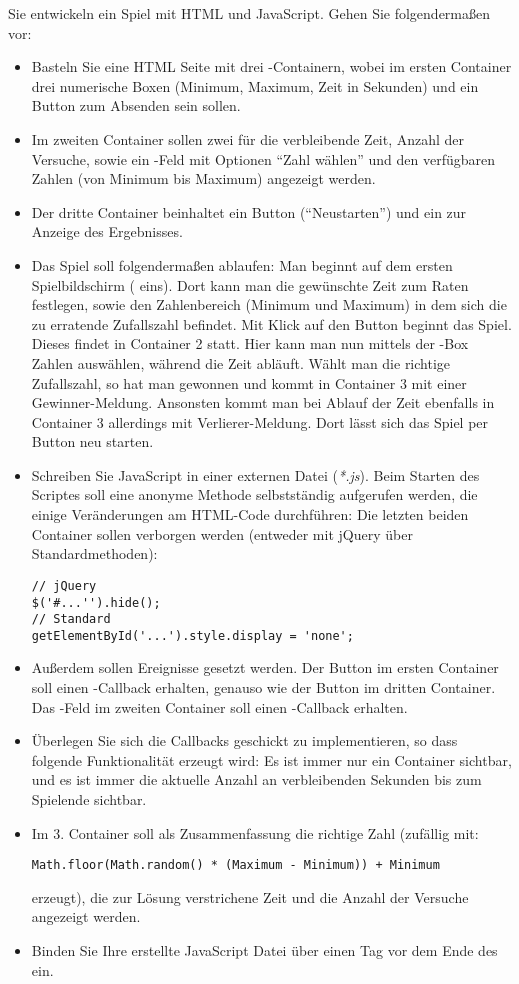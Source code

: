 %
\par Sie entwickeln ein Spiel mit HTML und JavaScript. Gehen Sie folgendermaßen
vor:
%
\begin{itemize}
\item
Basteln Sie eine HTML Seite mit drei -Containern, wobei im ersten
Container drei numerische Boxen (Minimum, Maximum, Zeit in Sekunden) und ein
Button zum Absenden sein sollen.
\item
Im zweiten Container sollen zwei  für die verbleibende Zeit, Anzahl der
Versuche, sowie ein -Feld mit Optionen ``Zahl wählen'' und den
verfügbaren Zahlen (von Minimum bis Maximum) angezeigt werden.
\item
Der dritte Container beinhaltet ein Button (``Neustarten'') und ein 
zur Anzeige des Ergebnisses.
\item
Das Spiel soll folgendermaßen ablaufen: Man beginnt auf dem ersten Spielbildschirm ( eins). Dort kann man die gewünschte Zeit zum Raten festlegen, sowie den Zahlenbereich (Minimum und Maximum) in dem sich die zu erratende Zufallszahl befindet. Mit Klick auf den Button beginnt das Spiel. Dieses findet in Container 2 statt. Hier kann man nun mittels der -Box Zahlen auswählen, während die Zeit abläuft. Wählt man die richtige Zufallszahl, so hat man gewonnen und kommt in Container 3 mit einer Gewinner-Meldung. Ansonsten kommt man bei Ablauf der Zeit ebenfalls in Container 3 allerdings mit Verlierer-Meldung. Dort lässt sich das Spiel per Button neu starten.
\item
Schreiben Sie JavaScript in einer externen Datei (\emph{*.js}). Beim Starten
des Scriptes soll eine anonyme Methode selbstständig aufgerufen werden, die
einige Veränderungen am HTML-Code durchführen: Die letzten beiden Container
sollen verborgen werden (entweder mit jQuery über Standardmethoden):
%
\begin{lstlisting}
// jQuery
$('#...'').hide();
// Standard
getElementById('...').style.display = 'none';
\end{lstlisting}
%
\item
Außerdem sollen Ereignisse gesetzt werden. Der Button im ersten Container soll
einen -Callback erhalten, genauso wie der Button im dritten
Container. Das -Feld im zweiten Container soll einen
-Callback erhalten.
\item
Überlegen Sie sich die Callbacks geschickt zu implementieren, so dass folgende
Funktionalität erzeugt wird: Es ist immer nur ein Container sichtbar, und es
ist immer die aktuelle Anzahl an verbleibenden Sekunden bis zum Spielende
sichtbar.
\item
Im 3. Container soll als Zusammenfassung die richtige Zahl (zufällig mit:
%
\begin{lstlisting}
Math.floor(Math.random() * (Maximum - Minimum)) + Minimum
\end{lstlisting}
%
erzeugt), die zur Lösung verstrichene Zeit und die Anzahl der Versuche
angezeigt werden.
\item
Binden Sie Ihre erstellte JavaScript Datei über einen  Tag vor dem
Ende des  ein.
\end{itemize}